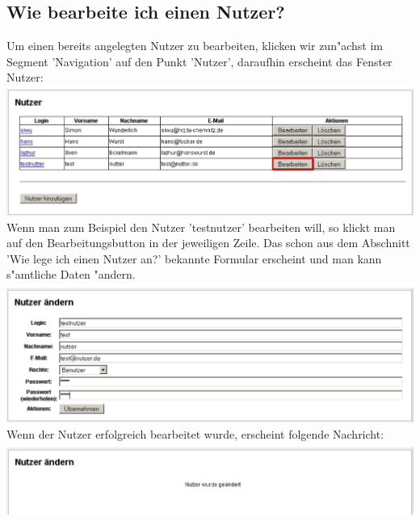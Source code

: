 \subsection{Wie bearbeite ich einen Nutzer?}
Um einen bereits angelegten Nutzer zu bearbeiten, klicken wir zun"achst im Segment 'Navigation' auf den Punkt 'Nutzer', daraufhin erscheint das Fenster 
Nutzer:\\
\includegraphics[scale=0.5]{nutzerbea}\\
Wenn man zum Beispiel den Nutzer 'testnutzer' bearbeiten will, so klickt man auf den Bearbeitungsbutton in der jeweiligen Zeile.
Das schon aus dem Abschnitt 'Wie lege ich einen Nutzer an?' bekannte Formular erscheint und man kann s"amtliche Daten "andern.\\
\includegraphics[scale=0.5]{nutzerbea2}\\
Wenn der Nutzer erfolgreich bearbeitet wurde, erscheint folgende Nachricht:\\
\includegraphics[scale=0.5]{nutzerbea3}

